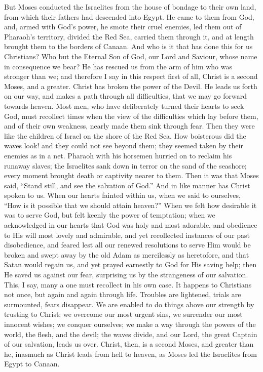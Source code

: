 But Moses conducted the Israelites from the house of bondage to
their own land, from which their fathers had descended into Egypt. He
came to them from God, and, armed with God's power, he smote their
cruel enemies, led them out of Pharaoh's territory, divided the Red
Sea, carried them through it, and at length brought them to the
borders of Canaan. And who is it that has done this for us Christians?
Who but the Eternal Son of God, our Lord and Saviour, whose name in
consequence we bear? He has rescued us from the arm of him who was
stronger than we; and therefore I say in this respect first of all,
Christ is a second Moses, and a greater. Christ has broken the power
of the Devil. He leads us forth on our way, and makes a path through
all difficulties, that we may go forward towards heaven. Most men, who
have deliberately turned their hearts to seek God, must recollect
times when the view of the difficulties which lay before them, and of
their own weakness, nearly made them sink through fear. Then they were
like the children of Israel on the shore of the Red Sea. How
boisterous did the waves look! and they could not see beyond them;
they seemed taken by their enemies as in a net. Pharaoh with his
horsemen hurried on to reclaim his runaway slaves; the Israelites sank
down in terror on the sand of the seashore; every moment brought death
or captivity nearer to them. Then it was that Moses said, ``Stand
still, and see the salvation of God.'' And in like manner has
Christ spoken to us. When our hearts fainted within us, when we said
to ourselves, ``How is it possible that we should attain
heaven?'' When we felt how desirable it was to serve God, but felt
keenly the power of temptation; when we acknowledged in our hearts
that God was holy and most adorable, and obedience to His will most
lovely and admirable, and yet recollected instances of our past
disobedience, and feared lest all our renewed resolutions to serve Him
would be broken and swept away by the old Adam as mercilessly as
heretofore, and that Satan would regain us, and yet prayed earnestly
to God for His saving help; then He saved us against our fear,
surprising us by the strangeness of our salvation. This, I say, many a
one must recollect in his own case. It happens to Christians not once,
but again and again through life. Troubles are lightened, trials are
surmounted, fears disappear. We are enabled to do things above our
strength by trusting to Christ; we overcome our most urgent sins, we
surrender our most innocent wishes; we conquer ourselves; we make a
way through the powers of the world, the flesh, and the devil; the
waves divide, and our Lord, the great Captain of our salvation, leads
us over. Christ, then, is a second Moses, and greater than he,
inasmuch as Christ leads from hell to heaven, as Moses led the
Israelites from Egypt to Canaan.

